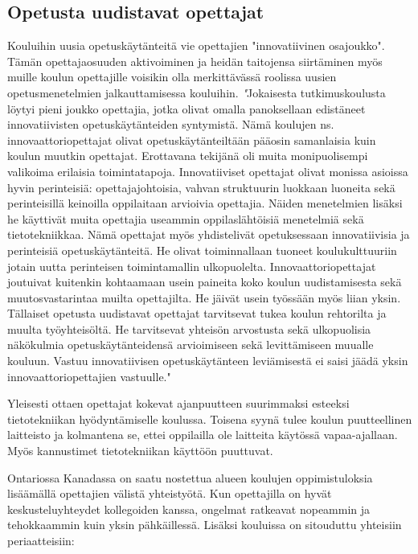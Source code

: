 \documentclass[utf8,bachelor]{gradu3}
\begin{document}
\subsection{Opetusta uudistavat opettajat}
Kouluihin uusia opetuskäytänteitä vie opettajien "innovatiivinen osajoukko". Tämän opettajaosuuden aktivoiminen ja heidän taitojensa siirtäminen myös muille koulun opettajille voisikin olla merkittävässä roolissa uusien opetusmenetelmien jalkauttamisessa kouluihin.
\textit "Jokaisesta tutkimuskoulusta löytyi pieni joukko opettajia, jotka olivat omalla panoksellaan edistäneet innovatiivisten opetuskäytänteiden syntymistä. Nämä koulujen ns. innovaattoriopettajat olivat opetuskäytänteiltään pääosin samanlaisia kuin koulun muutkin opettajat. Erottavana tekijänä oli muita monipuolisempi valikoima erilaisia toimintatapoja. Innovatiiviset opettajat olivat monissa asioissa hyvin perinteisiä: opettajajohtoisia, vahvan struktuurin luokkaan luoneita sekä perinteisillä keinoilla oppilaitaan arvioivia opettajia. Näiden menetelmien lisäksi he käyttivät muita opettajia useammin oppilaslähtöisiä menetelmiä sekä tietotekniikkaa. Nämä opettajat myös yhdistelivät opetuksessaan innovatiivisia ja perinteisiä opetuskäytänteitä. He olivat toiminnallaan tuoneet koulukulttuuriin jotain uutta perinteisen toimintamallin ulkopuolelta. Innovaattoriopettajat joutuivat kuitenkin kohtaamaan usein paineita koko koulun uudistamisesta sekä muutosvastarintaa muilta opettajilta. He jäivät usein työssään myös liian yksin. Tällaiset opetusta uudistavat opettajat tarvitsevat tukea koulun rehtorilta ja muulta työyhteisöltä. He tarvitsevat yhteisön arvostusta sekä ulkopuolisia näkökulmia opetuskäytänteidensä arvioimiseen sekä levittämiseen muualle kouluun. Vastuu innovatiivisen opetuskäytänteen leviämisestä ei saisi jäädä yksin innovaattoriopettajien vastuulle." \parencite[][]{koulunArki}

Yleisesti ottaen opettajat kokevat ajanpuutteen suurimmaksi esteeksi tietotekniikan hyödyntämiselle koulussa. Toisena syynä tulee koulun puutteellinen laitteisto ja kolmantena se, ettei oppilailla ole laitteita käytössä vapaa-ajallaan. \parencite[][]{sites} Myös kannustimet tietotekniikan käyttöön puuttuvat. \parencite[][]{itviikkoWilen}

Ontariossa Kanadassa on saatu nostettua alueen koulujen oppimistuloksia lisäämällä opettajien välistä yhteistyötä. Kun opettajilla on hyvät keskusteluyhteydet kollegoiden kanssa, ongelmat ratkeavat nopeammin ja tehokkaammin kuin yksin pähkäillessä. Lisäksi kouluissa on sitouduttu yhteisiin periaatteisiin:
\end{document}
